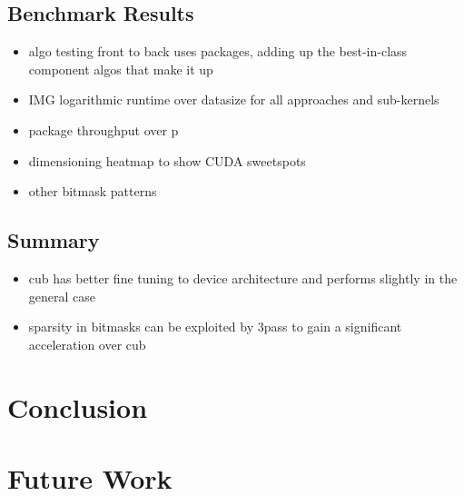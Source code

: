 \documentclass{tudscrartcl}
\begin{document}
		\subsection{Benchmark Results}
			\begin{itemize}
				\item algo testing front to back uses packages, adding up the best-in-class component algos that make it up
				\item IMG logarithmic runtime over datasize for all approaches and sub-kernels
				\item package throughput over p
				\item dimensioning heatmap to show CUDA sweetspots
				\item other bitmask patterns
			\end{itemize}
		
		\subsection{Summary}
		
			\begin{itemize}
				\item cub has better fine tuning to device architecture and performs slightly in the general case
				\item sparsity in bitmasks can be exploited by 3pass to gain a significant acceleration over cub
			\end{itemize}
		
	\section{Conclusion}
	
	\section{Future Work}
	
\end{document}
